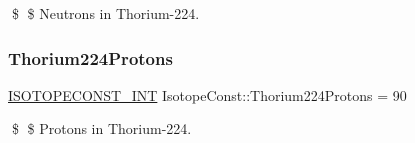 \$ \$ Neutrons in Thorium-\/224. \mbox{\label{group___isotope_const-_thorium-_th224_gaed88f5009858592a1c53cb3e6851217b}} 
\subsubsection{\texorpdfstring{Thorium224\+Protons}{Thorium224Protons}}
{\footnotesize\ttfamily \mbox{\hyperlink{group___isotope_const-_macros_ga5f18360b3e99483a35c32d789e62621c}{I\+S\+O\+T\+O\+P\+E\+C\+O\+N\+S\+T\+\_\+\+I\+NT}} Isotope\+Const\+::\+Thorium224\+Protons = 90}

\$ \$ Protons in Thorium-\/224. 